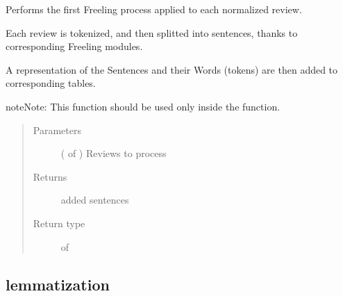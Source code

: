 \documentclass[letterpaper,10pt,english]{sphinxmanual}
\begin{document}
\begin{fulllineitems}
\label{\detokenize{process:loacore.process.sentence_process.add_sentences_from_reviews}}
Performs the first Freeling process applied to each normalized review.

Each review is tokenized, and then splitted into sentences, thanks to corresponding Freeling modules.

A representation of the Sentences and their Words (tokens) are then added to corresponding tables.

\begin{sphinxadmonition}{note}{Note:}
This function should be used only inside the  function.
\end{sphinxadmonition}
\begin{quote}\begin{description}
\item[{Parameters}] \leavevmode
{} ( of {\hyperref[\detokenize{classes:loacore.classes.classes.Review}]{}}) \textendash{} Reviews to process

\item[{Returns}] \leavevmode
added sentences

\item[{Return type}] \leavevmode
{} of {\hyperref[\detokenize{classes:loacore.classes.classes.Sentence}]{}}

\end{description}\end{quote}

\end{fulllineitems}



\subsection{lemmatization}
\label{\detokenize{process:module-loacore.process.lemma_process}}\label{\detokenize{process:lemmatization}}
\end{document}
